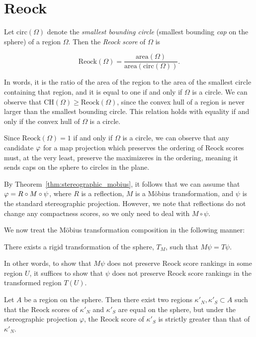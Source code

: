 \section{Reock}\label{sec:reock}

Let $\mathrm{circ}(\Omega)$ denote the \textit{smallest bounding
circle} (smallest bounding \textit{cap} on the sphere) of a region
$\Omega$.  Then the \textit{Reock score} of $\Omega$ is 

$$\mathrm{Reock}(\Omega)=
\frac{\mathrm{area}(\Omega)}{\mathrm{area}(\mathrm{circ}(\Omega))}.$$

In words, it is the ratio of the area of the region to the area of the
smallest circle containing that region, and it is equal to one if and
only if $\Omega$ is a circle.  We can observe that
$\mathrm{CH}(\Omega)\geq \mathrm{Reock}(\Omega)$, since the convex
hull of a region is never larger than the smallest bounding circle.
This relation holds with equality if and only if the convex hull of
$\Omega$ is a circle.  

Since $\mathrm{Reock}(\Omega)=1$ if and only if $\Omega$ is a circle,
we can observe that any candidate $\varphi$ for a map projection 
which preserves the ordering of Reock scores must, at the 
very least, preserve the maximizeres in the ordering, meaning 
it sends caps on the sphere to circles in the plane.  

By Theorem~\ref{thm:stereographic_mobius}, it follows that 
we can assume that $\varphi=R\circ M \circ \psi$, 
where $R$ is a reflection, $M$ is a M\"{o}bius 
transformation, and $\psi$ is the standard 
stereographic projection. However, we note that reflections do not 
change any compactness scores, so we only need 
to deal with $M\circ \psi$.

We now treat the M\"{o}bius transformation composition 
in the following manner:
\begin{claim}
  There exists a rigid transformation of the 
  sphere, $T_M$, such that $M\psi = T\psi$.
\end{claim}
In other words, to show that $M\psi$ 
does not preserve Reock score rankings 
in some region $U$, it suffices to show that 
$\psi$ does not preserve Reock score 
rankings in the transformed region 
$T(U)$.

\begin{theorem}\label{thm:reock}
  Let $A$ be a region on the sphere.  Then there exist two regions
  $\kappa'_N,\kappa'_S\subset A$ such that the Reock scores of
  $\kappa'_N$ and $\kappa'_S$ are equal on the sphere, but under the
  stereographic projection $\varphi$, the Reock score of $\kappa'_S$
  is strictly greater than that of $\kappa'_N$. 
\end{theorem}


